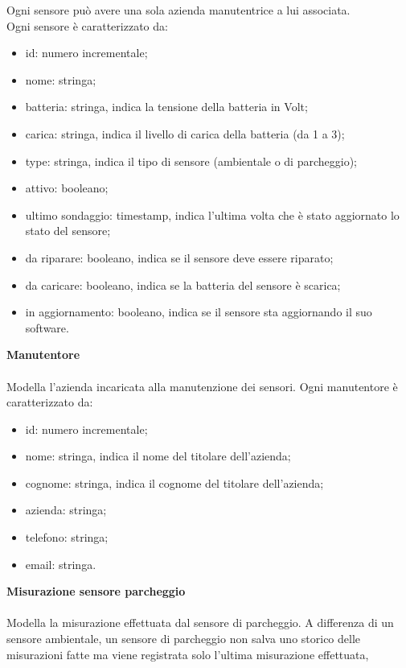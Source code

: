 Ogni sensore può avere una sola azienda manutentrice a lui associata.
\\
Ogni sensore è caratterizzato da:
\begin{itemize}
    \item id: numero incrementale;
    \item nome: stringa;
    \item batteria: stringa, indica la tensione della batteria in Volt;
    \item carica: stringa, indica il livello di carica della batteria (da 1 a 3);
    \item type: stringa, indica il tipo di sensore (ambientale o di parcheggio);
    \item attivo: booleano;
    \item ultimo sondaggio: timestamp, indica l'ultima volta che è stato aggiornato lo stato del sensore;
    \item da riparare: booleano, indica se il sensore deve essere riparato;
    \item da caricare: booleano, indica se la batteria del sensore è scarica;
    \item in aggiornamento: booleano, indica se il sensore sta aggiornando il suo software.
\end{itemize}
\leavevmode\newline
\textbf{Manutentore}
\\\\
Modella l'azienda incaricata alla manutenzione dei sensori.
Ogni manutentore è caratterizzato da:
\begin{itemize}
    \item id: numero incrementale;
    \item nome: stringa, indica il nome del titolare dell'azienda;
    \item cognome: stringa, indica il cognome del titolare dell'azienda;
    \item azienda: stringa;
    \item telefono: stringa;
    \item email: stringa.
\end{itemize}
\leavevmode\newline
\textbf{Misurazione sensore parcheggio}
\\\\
Modella la misurazione effettuata dal sensore di parcheggio. A differenza di un sensore ambientale, un sensore
di parcheggio non salva uno storico delle misurazioni fatte ma viene registrata solo l'ultima misurazione effettuata,
